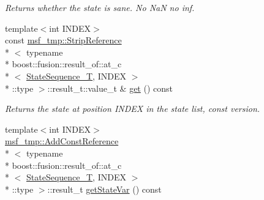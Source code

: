 \begin{DoxyCompactItemize}
\begin{DoxyCompactList}\small\item\em Returns whether the state is sane. No Na\-N no inf. \end{DoxyCompactList}\item 
\hypertarget{structmsf__core_1_1GenericState__T_a7c634b0071239e42781a3603b00c9749}{{\footnotesize template$<$int I\-N\-D\-E\-X$>$ }\\const \hyperlink{structmsf__tmp_1_1StripReference}{msf\-\_\-tmp\-::\-Strip\-Reference}\\*
$<$ typename \\*
boost\-::fusion\-::result\-\_\-of\-::at\-\_\-c\\*
$<$ \hyperlink{structmsf__core_1_1GenericState__T_a75fe70f7c7517dbf7d4c91b75b08a1dd}{State\-Sequence\-\_\-\-T}, I\-N\-D\-E\-X $>$\\*
\-::type $>$\-::result\-\_\-t\-::value\-\_\-t \& \hyperlink{structmsf__core_1_1GenericState__T_a7c634b0071239e42781a3603b00c9749}{get} () const }\label{structmsf__core_1_1GenericState__T_a7c634b0071239e42781a3603b00c9749}

\begin{DoxyCompactList}\small\item\em Returns the state at position I\-N\-D\-E\-X in the state list, const version. \end{DoxyCompactList}\item 
\hypertarget{structmsf__core_1_1GenericState__T_a932947fcec47edfe556d37087cc74c5b}{{\footnotesize template$<$int I\-N\-D\-E\-X$>$ }\\\hyperlink{structmsf__tmp_1_1AddConstReference}{msf\-\_\-tmp\-::\-Add\-Const\-Reference}\\*
$<$ typename \\*
boost\-::fusion\-::result\-\_\-of\-::at\-\_\-c\\*
$<$ \hyperlink{structmsf__core_1_1GenericState__T_a75fe70f7c7517dbf7d4c91b75b08a1dd}{State\-Sequence\-\_\-\-T}, I\-N\-D\-E\-X $>$\\*
\-::type $>$\-::result\-\_\-t \hyperlink{structmsf__core_1_1GenericState__T_a932947fcec47edfe556d37087cc74c5b}{get\-State\-Var} () const }\label{structmsf__core_1_1GenericState__T_a932947fcec47edfe556d37087cc74c5b}


\end{DoxyCompactItemize}
